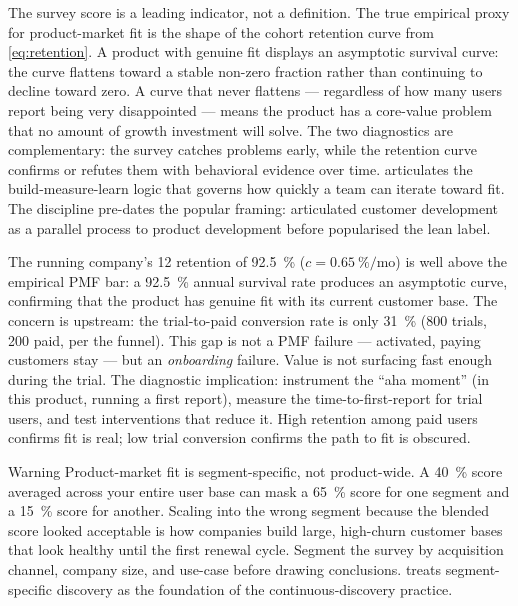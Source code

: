 The survey score is a leading indicator, not a definition. The true empirical proxy
for product-market fit is the shape of the cohort retention curve from \cref{eq:retention}.
A product with genuine fit displays an asymptotic survival curve: the curve flattens
toward a stable non-zero fraction rather than continuing to decline toward zero.
A curve that never flattens --- regardless of how many users report being very
disappointed --- means the product has a core-value problem that no amount of
growth investment will solve. The two diagnostics are complementary: the survey
catches problems early, while the retention curve confirms or refutes them with
behavioral evidence over time. \textcite{ries2011} articulates the build-measure-learn
logic that governs how quickly a team can iterate toward fit. The discipline pre-dates the popular framing: \textcite{blank2005foursteps} articulated customer development as a parallel process to product development before \textcite{ries2011} popularised the lean label.

\begin{example}
The running company's \qty{12}{} retention of \qty{92.5}{\percent} (\(c =
\qty{0.65}{\percent}/\text{mo}\)) is well above the empirical PMF bar: a \qty{92.5}{\percent}
annual survival rate produces an asymptotic curve, confirming that the product has genuine
fit with its current customer base. The concern is upstream: the trial-to-paid conversion
rate is only \qty{31}{\percent} (800 trials, 200 paid, per the funnel). This gap is not a
PMF failure --- activated, paying customers stay --- but an \emph{onboarding} failure.
Value is not surfacing fast enough during the trial. The diagnostic implication: instrument
the ``aha moment'' (in this product, running a first report), measure the time-to-first-report
for trial users, and test interventions that reduce it. High retention among paid users
confirms fit is real; low trial conversion confirms the path to fit is obscured.
\end{example}

\begin{admonition}{Warning}
Product-market fit is segment-specific, not product-wide. A \qty{40}{\percent} score
averaged across your entire user base can mask a \qty{65}{\percent} score for one segment
and a \qty{15}{\percent} score for another. Scaling into the wrong segment because the
blended score looked acceptable is how companies build large, high-churn customer bases
that look healthy until the first renewal cycle. Segment the survey by acquisition channel,
company size, and use-case before drawing conclusions. \textcite{torres2021continuous}
treats segment-specific discovery as the foundation of the continuous-discovery practice.
\end{admonition}

